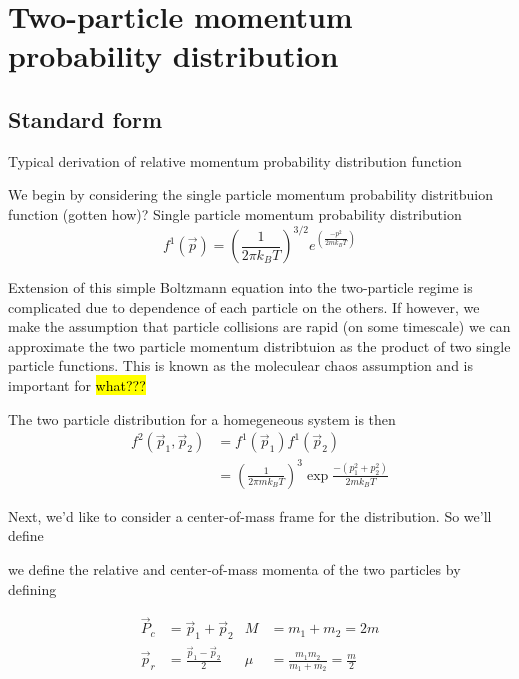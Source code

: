 \chapter{Two-particle momentum probability distribution} \label{app:momDistDer}

\section{Standard form}
\label{sec:standardDist}

Typical derivation of relative momentum probability distribution function

We begin by considering the single particle momentum probability distritbuion function (gotten how)? 
Single particle momentum probability distribution
\begin{equation} 
\label{eq:single_particle_prob}
		 f^1( \vec{p} ) = \left(\frac{1}{2 \pi k_B T}\right)^{3/2} e^{\left(\frac{-p^2}{2 m k_B T}\right)}
\end{equation}

\noindent
Extension of this simple Boltzmann equation into the two-particle regime is complicated due to dependence of each particle on the others. If however, we make the assumption that particle collisions are rapid (on some timescale) we can approximate the two particle momentum distribtuion as the product of two single particle functions. This is known as the moleculear chaos assumption and is important for \hl{what???}

The two particle distribution for a homegeneous system is then
\begin{equation}
\label{eq:two_particle_prob}
\begin{split}
		 f^2( \vec{p}_1, \vec{p}_2 ) &= f^1( \vec{p}_1 ) f^1( \vec{p}_2 ) \\
		  &= \left(\frac{1}{2 \pi m k_B T}\right)^3 \exp{\frac{-(p_1^2 + p_2^2)}{2 m k_B T}}
\end{split}
\end{equation}

Next, we'd like to consider a center-of-mass frame for the distribution. So we'll define

 we define the relative and center-of-mass momenta of the two particles by defining

\begin{align*}
	\vec{P}_c & = \vec{p}_1 + \vec{p}_2             &	M   &= m_1 + m_2 = 2m \\
	\vec{p}_r & = \frac{\vec{p}_1 - \vec{p}_2}{2}   &   \mu &= \frac{m_1 m_2}{m_1 + m_2} = \frac{m}{2}
\end{align*}

